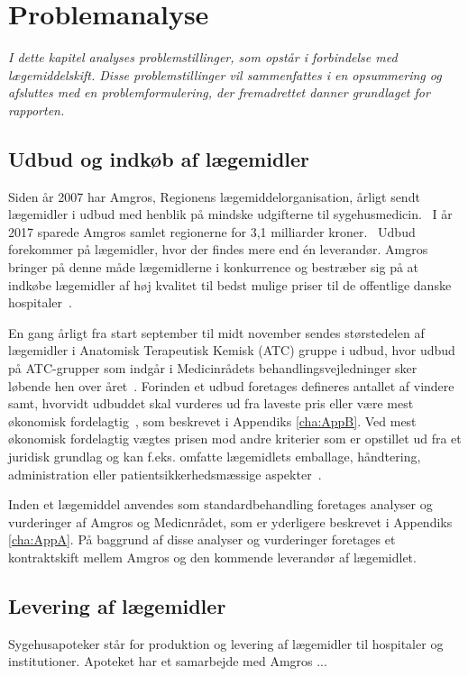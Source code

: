 \chapter{Problemanalyse}
\textit{I dette kapitel analyses problemstillinger, som opstår i forbindelse med lægemiddelskift. Disse problemstillinger vil sammenfattes i en opsummering og afsluttes med en problemformulering, der fremadrettet danner  grundlaget for rapporten.}

\section{Udbud og indkøb af lægemidler}
Siden år 2007 har Amgros, Regionens lægemiddelorganisation, årligt sendt lægemidler i udbud med henblik på mindske udgifterne til sygehusmedicin.~\citep{Sygehusapoteket2017, Amgros2017} I år 2017 sparede Amgros samlet regionerne for 3,1 milliarder kroner.~\citep{Amgros2015} Udbud forekommer på lægemidler, hvor der findes mere end én leverandør\citep{Amgros2015}. Amgros bringer på denne måde lægemidlerne i konkurrence og bestræber sig på at indkøbe lægemidler af høj kvalitet til bedst mulige priser til de offentlige danske hospitaler~\citep{Amgros2015}.

En gang årligt fra start september til midt november sendes størstedelen af lægemidler i Anatomisk Terapeutisk Kemisk (ATC) gruppe i udbud, hvor udbud på ATC-grupper som indgår i Medicinrådets behandlingsvejledninger sker løbende hen over året~\citep{Sygehusapoteket2017}. Forinden et udbud foretages defineres antallet af vindere samt, hvorvidt udbuddet skal vurderes ud fra laveste pris eller være mest økonomisk fordelagtig~\citep{Amgros2018a}, som beskrevet i Appendiks \ref{cha:AppB}. Ved mest økonomisk fordelagtig vægtes prisen mod andre kriterier som er opstillet ud fra et juridisk grundlag og kan f.eks. omfatte lægemidlets emballage, håndtering, administration eller patientsikkerhedsmæssige aspekter~\citep{Amgros2018a}.

Inden et lægemiddel anvendes som standardbehandling foretages analyser og vurderinger af Amgros og Medicnrådet, som er yderligere beskrevet i Appendiks \ref{cha:AppA}. På baggrund af disse analyser og vurderinger foretages et kontraktskift mellem Amgros og den kommende leverandør af lægemidlet.

\section{Levering af lægemidler}
Sygehusapoteker står for produktion og levering af lægemidler til hospitaler og institutioner. Apoteket har et samarbejde med Amgros ...

